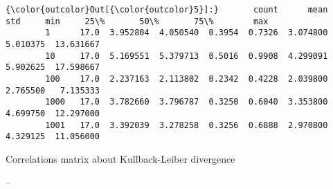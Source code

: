 \documentclass[11pt]{article}
\begin{document}
\begin{Verbatim}[commandchars=\\\{\}]
{\color{outcolor}Out[{\color{outcolor}5}]:}       count      mean       std     min     25\%       50\%       75\%        max
        1      17.0  3.952804  4.050540  0.3954  0.7326  3.074800  5.010375  13.631667
        10     17.0  5.169551  5.379713  0.5016  0.9908  4.299091  5.902625  17.598667
        100    17.0  2.237163  2.113802  0.2342  0.4228  2.039800  2.765500   7.135333
        1000   17.0  3.782660  3.796787  0.3250  0.6040  3.353800  4.699750  12.297000
        1001   17.0  3.392039  3.278258  0.3256  0.6888  2.970800  4.329125  11.056000
\end{Verbatim}
            
    Correlations matrix about Kullback-Leiber divergence

--
\end{document}
